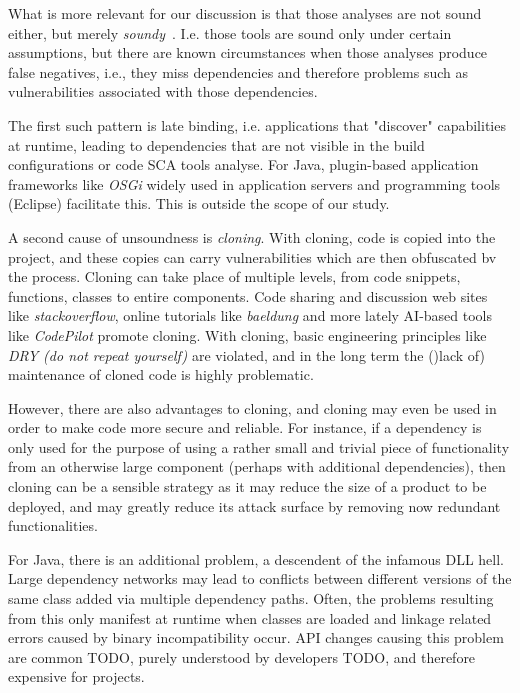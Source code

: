 What is more  relevant for our discussion  is that those analyses are not sound either, but merely \textit{soundy}~\cite{livshits2015defense}. I.e. those tools are sound only under certain assumptions, but there are known circumstances when those analyses produce false negatives, i.e., they miss dependencies and therefore problems such as vulnerabilities associated with those dependencies.
 
 The first such pattern is late binding, i.e. applications that "discover" capabilities at runtime, leading to dependencies that are not visible in the build configurations or code SCA tools analyse.  For Java, plugin-based application frameworks like \textit{OSGi} widely used in application servers and programming tools (Eclipse) facilitate this.  This is outside the scope of our study. 
 
 
 A second cause of unsoundness is \textit{cloning}. With cloning, code is copied into the project, and these copies can carry vulnerabilities which are then obfuscated bv the process. Cloning can take place of multiple levels, from code snippets, functions, classes to entire components.  Code sharing and discussion web sites like \textit{stackoverflow}, online tutorials like \textit{baeldung} and more lately AI-based tools like \textit{CodePilot} promote cloning.  With cloning, basic engineering principles like \textit{DRY (do not repeat yourself)} are violated, and in the long term the ()lack of) maintenance of cloned code is highly problematic. 
 
 However, there are also advantages to cloning, and cloning may even be used in order to make code more secure and reliable. For instance, if a dependency is only used for the purpose of using  a rather small and trivial piece of functionality from an otherwise large component (perhaps with additional dependencies), then cloning can be a sensible strategy as it may reduce the size of a product to be deployed, and may greatly reduce its attack surface by removing now redundant functionalities. 
 
 For Java, there is an additional problem, a descendent of the infamous DLL hell. Large dependency networks may lead to conflicts between different versions of the same class added via multiple dependency paths. Often, the problems resulting from this only manifest at runtime when classes are loaded and linkage related errors caused by binary incompatibility occur. API changes causing this problem are common TODO,  purely understood by developers TODO, and therefore expensive for projects. 
 
